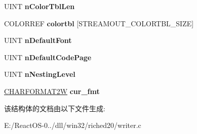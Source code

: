 \begin{DoxyCompactItemize}
U\+I\+NT {\bfseries n\+Color\+Tbl\+Len}
\item 
\mbox{\label{structtag_m_e___out_stream_a3a2345ee33c0e68c706d7383b84d6431}} 
C\+O\+L\+O\+R\+R\+EF {\bfseries colortbl} \mbox{[}S\+T\+R\+E\+A\+M\+O\+U\+T\+\_\+\+C\+O\+L\+O\+R\+T\+B\+L\+\_\+\+S\+I\+ZE\mbox{]}
\item 
\mbox{\label{structtag_m_e___out_stream_ad1779d1edcdb04fe0e21612a6b79eb07}} 
U\+I\+NT {\bfseries n\+Default\+Font}
\item 
\mbox{\label{structtag_m_e___out_stream_afa8afc287f1fee0d8b134ee506c268bd}} 
U\+I\+NT {\bfseries n\+Default\+Code\+Page}
\item 
\mbox{\label{structtag_m_e___out_stream_ad711d17ed89d51ac35dd381b79643827}} 
U\+I\+NT {\bfseries n\+Nesting\+Level}
\item 
\mbox{\label{structtag_m_e___out_stream_aa9496b2d7e6778bca1575a4ad036c059}} 
\hyperlink{struct__charformat2w}{C\+H\+A\+R\+F\+O\+R\+M\+A\+T2W} {\bfseries cur\+\_\+fmt}
\end{DoxyCompactItemize}


该结构体的文档由以下文件生成\+:\begin{DoxyCompactItemize}
\item 
E\+:/\+React\+O\+S-\/0../dll/win32/riched20/writer.\+c\end{DoxyCompactItemize}
